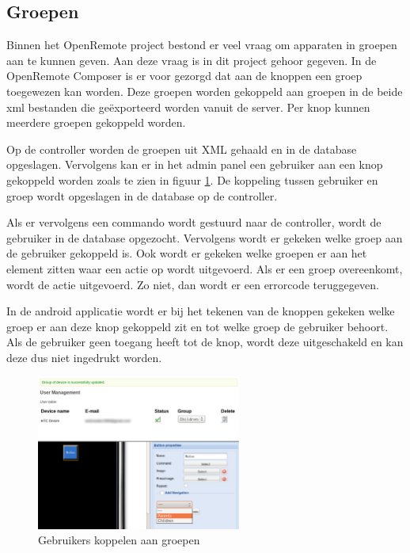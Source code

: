 \documentclass[]{article}
\begin{document}
\subsection{Groepen}
Binnen het OpenRemote project bestond er veel vraag om apparaten in groepen aan
te kunnen geven. Aan deze vraag is in dit project gehoor gegeven. In de
OpenRemote Composer is er voor gezorgd dat aan de knoppen een groep toegewezen
kan worden. Deze groepen worden gekoppeld aan groepen in de beide xml bestanden
die ge\"exporteerd worden vanuit de server. Per knop kunnen meerdere groepen
gekoppeld worden.

Op de controller worden de groepen uit XML gehaald en in de database opgeslagen.
Vervolgens kan er in het admin panel een gebruiker aan een knop gekoppeld
worden zoals te zien in figuur \ref{usergroups}. De koppeling tussen gebruiker
en groep wordt opgeslagen in de database op de controller. 

Als er vervolgens een commando wordt gestuurd naar de controller, wordt de
gebruiker in de database opgezocht. Vervolgens wordt er gekeken welke groep aan
de gebruiker gekoppeld is. Ook wordt er gekeken welke groepen er aan het element
zitten waar een actie op wordt uitgevoerd. Als er een groep overeenkomt, wordt
de actie uitgevoerd. Zo niet, dan wordt er een errorcode teruggegeven.

In de android applicatie wordt er bij het tekenen van de knoppen gekeken welke
groep er aan deze knop gekoppeld zit en tot welke groep de gebruiker behoort.
Als de gebruiker geen toegang heeft tot de knop, wordt deze uitgeschakeld en kan deze
dus niet ingedrukt worden.

\begin{figure}[htpb]
   \begin{center}
     \includegraphics[width=0.6\textwidth]{usergroups.pdf}
   \end{center}
   \caption{Gebruikers koppelen aan groepen}
   \label{usergroups}
\end{figure}
\end{document}
